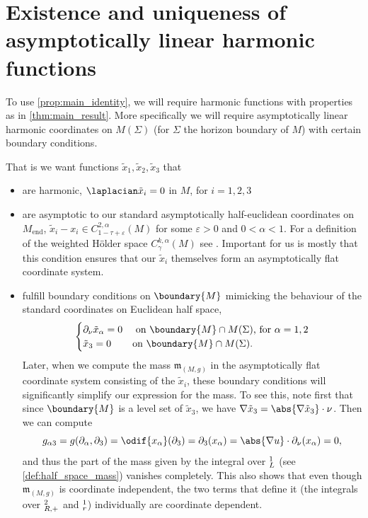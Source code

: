 \documentclass[titlepage,numbers=noenddot,headinclude,oneside,%
footinclude=true,cleardoublepage=empty,%
BCOR=5mm,paper=a4,fontsize=11pt,%
english,%
]{scrartcl}
\let\sphere\relax
\newcommand{\sphere}{\mathbb{S}}
\newcommand{\Mend}{M_{\mathrm{end}}} %
\newcommand{\mass}[2]{\mathfrak{m}_{(#1,#2)}} %
\begin{document}
\section{Existence and uniqueness of asymptotically linear harmonic functions}
To use \cref{prop:main_identity}, we will require harmonic functions with properties as in \cref{thm:main_result}. More specifically we will require asymptotically linear harmonic coordinates on \( M(\Sigma) \) (for \( \Sigma \) the horizon boundary of \( M \)) with certain boundary conditions.

That is we want functions \( \tilde{x}_1,\tilde{x}_2,\tilde{x}_3 \) that
\begin{itemize}
    \item are harmonic, \ie \( \laplacian \tilde{x}_i=0 \) in \( M \), for \( i=1,2,3 \)
    \item are asymptotic to our standard asymptotically half-euclidean coordinates on \(  \Mend \), \ie \( \tilde{x}_i-x_i\in C_{1-\tau+\varepsilon}^{2,\alpha}(M) \) for some \( \varepsilon>0 \) and \( 0<\alpha<1 \). For a definition of the weighted Hölder space \( C_\gamma^{k,\alpha}(M) \) see \cite[682]{almarazPositiveMassTheorem2016}. Important for us is mostly that this condition ensures that our \( \tilde{x}_i \) themselves form an asymptotically flat coordinate system.


    \item fulfill boundary conditions on \( \boundary{M} \) mimicking the behaviour of the standard coordinates on Euclidean half space, \ie
    \begin{equation*}
        \begin{cases}
            \partial_\nu \tilde{x}_\alpha=0 &\text{ on \( \boundary{M} \cap M(\Sigma) \), for \( \alpha=1,2 \)}\\
            \tilde{x}_3=0 &\text{on \( \boundary{M}\cap M(\Sigma) \)}.
        \end{cases}
    \end{equation*}
    Later, when we compute the mass \( \mass{M}{g} \) in the asymptotically flat coordinate system consisting of the \( \tilde{x}_i \), these boundary conditions will significantly simplify our expression for the mass. To see this, note first that since \( \boundary{M} \) is a level set of \( \tilde{x}_3 \), we have \( \nabla \tilde{x}_3=\abs{\nabla \tilde{x}_3}\cdot \nu \). Then we can compute
    \begin{equation}
        g_{\alpha 3}=g(\partial_\alpha,\partial_3)=\odif{x_{\alpha}}(\partial_3)=\partial_{3}(x_\alpha)=\abs{\nabla u}\cdot \partial_\nu (x_\alpha)=0,\label{eq:mass_expression_simplifies}
    \end{equation}
    and thus the part of the mass given by the integral over \( \sphere^1_L \) (see \cref{def:half_space_mass}) vanishes completely. This also shows that even though \( \mass{M}{g} \) is coordinate independent, the two terms that define it (the integrals over \( \sphere^2_{R,+} \) and \( \sphere_r^1 \)) individually are coordinate dependent.


\end{itemize}
\end{document}
